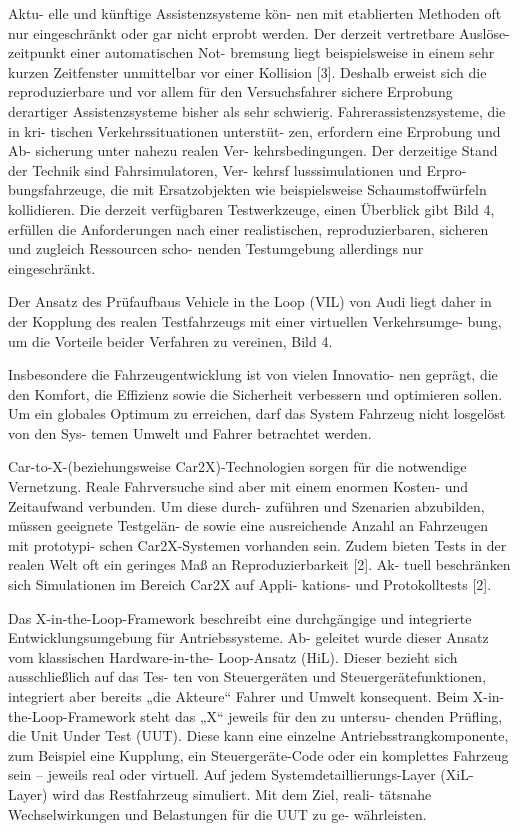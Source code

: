 Aktu- elle und künftige Assistenzsysteme kön- nen mit etablierten Methoden oft nur eingeschränkt oder gar nicht erprobt werden. Der derzeit vertretbare Auslöse- zeitpunkt einer automatischen Not- bremsung liegt beispielsweise in einem sehr kurzen Zeitfenster unmittelbar vor einer Kollision [3]. Deshalb erweist sich die reproduzierbare und vor allem für den Versuchsfahrer sichere Erprobung derartiger Assistenzsysteme bisher als sehr schwierig. Fahrerassistenzsysteme, die in kri- tischen Verkehrssituationen unterstüt- zen, erfordern eine Erprobung und Ab- sicherung unter nahezu realen Ver- kehrsbedingungen. Der derzeitige Stand der Technik sind Fahrsimulatoren, Ver- kehrsf lusssimulationen und Erpro- bungsfahrzeuge, die mit Ersatzobjekten wie beispielsweise Schaumstoffwürfeln kollidieren. Die derzeit verfügbaren Testwerkzeuge, einen Überblick gibt Bild 4, erfüllen die Anforderungen nach einer realistischen, reproduzierbaren, sicheren und zugleich Ressourcen scho- nenden Testumgebung allerdings nur eingeschränkt. \cite{bock2008vehicle}

Der Ansatz des Prüfaufbaus Vehicle in the Loop (VIL) von Audi liegt daher in der Kopplung des realen Testfahrzeugs mit einer virtuellen Verkehrsumge- bung, um die Vorteile beider Verfahren zu vereinen, Bild 4. \cite{bock2008vehicle}

Insbesondere die Fahrzeugentwicklung ist von vielen Innovatio- nen geprägt, die den Komfort, die Effizienz sowie die Sicherheit verbessern und optimieren sollen. Um ein globales Optimum zu erreichen, darf das System Fahrzeug nicht losgelöst von den Sys- temen Umwelt und Fahrer betrachtet werden. \cite{albers2010x}

Car-to-X-(beziehungsweise Car2X)-Technologien sorgen für die notwendige Vernetzung. Reale Fahrversuche sind aber mit einem enormen Kosten- und Zeitaufwand verbunden. Um diese durch- zuführen und Szenarien abzubilden, müssen geeignete Testgelän- de sowie eine ausreichende Anzahl an Fahrzeugen mit prototypi- schen Car2X-Systemen vorhanden sein. Zudem bieten Tests in der realen Welt oft ein geringes Maß an Reproduzierbarkeit [2]. Ak- tuell beschränken sich Simulationen im Bereich Car2X auf Appli- kations- und Protokolltests [2].\cite{albers2010x}

Das X-in-the-Loop-Framework beschreibt eine durchgängige und integrierte Entwicklungsumgebung für Antriebssysteme. Ab- geleitet wurde dieser Ansatz vom klassischen Hardware-in-the- Loop-Ansatz (HiL). Dieser bezieht sich ausschließlich auf das Tes- ten von Steuergeräten und Steuergerätefunktionen, integriert aber bereits „die Akteure“ Fahrer und Umwelt konsequent. Beim X-in- the-Loop-Framework steht das „X“ jeweils für den zu untersu- chenden Prüfling, die Unit Under Test (UUT). Diese kann eine einzelne Antriebsstrangkomponente, zum Beispiel eine Kupplung, ein Steuergeräte-Code oder ein komplettes Fahrzeug sein – jeweils real oder virtuell. Auf jedem Systemdetaillierungs-Layer (XiL-Layer) wird das Restfahrzeug simuliert. Mit dem Ziel, reali- tätsnahe Wechselwirkungen und Belastungen für die UUT zu ge- währleisten.\cite{albers2010x}

